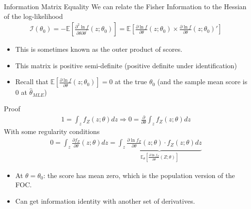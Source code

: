 \documentclass[aspectratio=169,11pt]{beamer}
\begin{document}
\begin{frame}{Information Matrix Equality}
We can relate the \alert{Fisher Information} to the Hessian of the log-likelihood
\begin{align*}
\mathcal { I } \left( \theta _ { 0 } \right) = - \mathbb { E } \left[ \frac { \partial ^ { 2 } \ln f } { \partial \theta \partial \theta ^ { \prime } } \left( z ; \theta _ { 0 } \right) \right] 
= \mathbb { E } \left[ \frac { \partial \ln f } { \partial \theta } \left( z ; \theta _ { 0 } \right) \times \frac { \partial \ln f } { \partial \theta  } \left( z ; \theta _ { 0 } \right)' \right]
\end{align*}
\begin{itemize}
    \item This is sometimes known as the \alert{outer product of scores}.
    \item This matrix is \alert{positive semi-definite} (positive definite under identification)
    \item Recall that $ \mathbb { E } \left[ \frac { \partial \ln f } { \partial \theta } \left( z ; \theta _ { 0 } \right) \right] = 0$ at the true $\theta_0$ (and the sample mean score is $0$ at $\widehat{\theta}_{MLE}$)
\end{itemize}
\end{frame}


\begin{frame}{Proof}
\begin{align*}
1 = \int _ { z } f _ { Z } ( z ; \theta ) d z \Rightarrow 0 = \frac { \partial } { \partial \theta } \int _ { z } f _ { Z } ( z ; \theta ) d z
\end{align*}
With some regularity conditions
\begin{align*}
0 = \int _ { z } \frac { \partial f _ { Z } } { \partial \theta } ( z ; \theta ) d z = \underbrace{\int _ { z } \frac { \partial \ln f _ { Z } } { \partial \theta } ( z ; \theta ) \cdot f _ { Z } ( z ; \theta ) d z}_{\mathbb { E }_{\theta} \left[ \frac { \partial \ln f _ { Z } } { \partial \theta } \left( Z ; \theta \right) \right]}
\end{align*}

\begin{itemize}
    \item At $\theta=\theta_0$: the score has mean zero, which is the population version of the FOC.
    \item Can get information identity with another set of derivatives.
    \end{itemize}
\end{frame}
\end{document}
